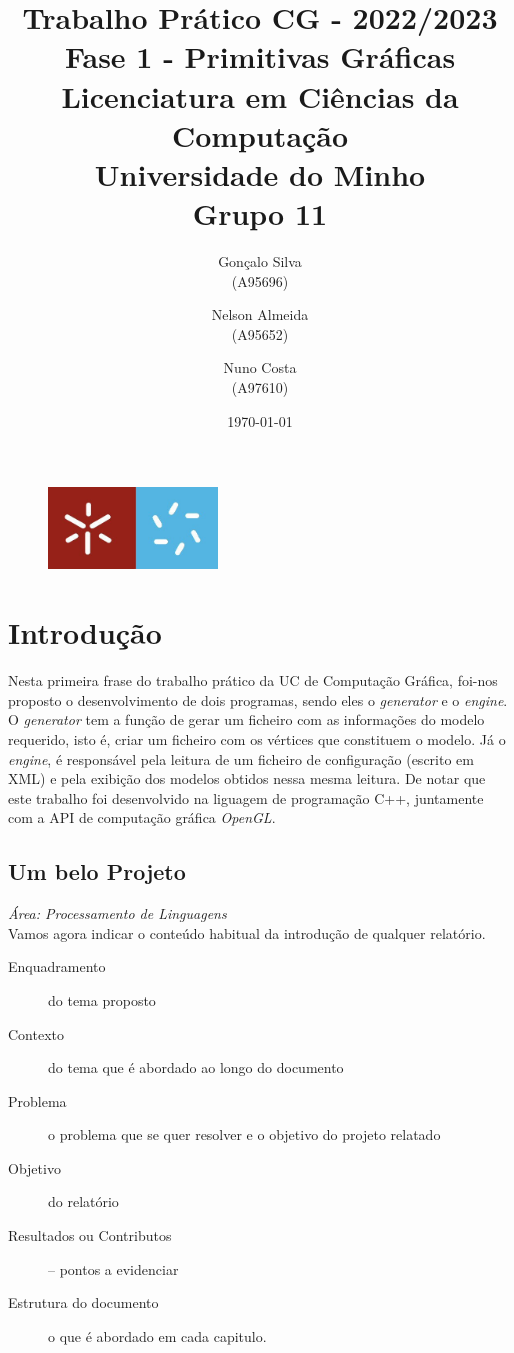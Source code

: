\documentclass[11pt,a4paper]{report}%
\title{\textbf{Trabalho Prático CG - 2022/2023}\\
       \textbf{Fase 1 - Primitivas Gráficas}\\ Licenciatura em Ciências da Computação\\ Universidade do Minho \\ Grupo 11
       } %
\author{Gonçalo Silva\\ (A95696) \and Nelson Almeida\\ (A95652) \and Nuno Costa\\ (A97610)
       } %
\date{\today} %
\def\titulo#1{\section{#1}}    %
\def\area#1{{\em \'{A}rea: #1}\\[0.2cm]}
\begin{document}

\begin{figure} %
	\includegraphics[width=0.4\textwidth]{images/logo.jpg}
\end{figure}

\maketitle %
\tableofcontents %

\chapter{Introdução} \label{chap:intro} %

Nesta primeira frase do trabalho prático da UC de Computação Gráfica, foi-nos proposto o desenvolvimento de dois programas, sendo eles o \emph{generator} e o \emph{engine}. O \emph{generator} tem a função de gerar um ficheiro com as informações do modelo requerido, isto é, criar um ficheiro com os vértices que constituem o modelo. Já o \emph{engine}, é responsável pela leitura de um ficheiro de configuração (escrito em XML) e pela exibição dos modelos obtidos nessa mesma leitura. De notar que este trabalho foi desenvolvido na liguagem de programação C++, juntamente com a API de computação gráfica \emph{OpenGL}.\\


\titulo{Um belo Projeto}
\area{Processamento de Linguagens}

Vamos agora indicar o conteúdo habitual da introdução de qualquer relatório.
\begin{description}  %
  \item[Enquadramento]  do tema proposto
  \item[Contexto] do tema que é abordado ao  longo do documento
  \item[Problema] o problema que se quer resolver e o objetivo do projeto relatado
  \item[Objetivo] do relatório
  \item[Resultados ou Contributos] -- pontos a evidenciar
  \item[Estrutura do documento] o que é abordado em cada capitulo.
\end{description}
\end{document}
